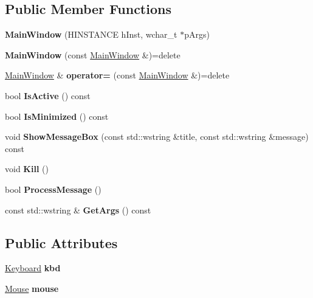 \subsection*{Public Member Functions}
\begin{DoxyCompactItemize}
\item 
\mbox{\label{class_main_window_a61c12aad464d82e94156c1b1b3e63c7a}} 
{\bfseries Main\+Window} (H\+I\+N\+S\+T\+A\+N\+CE h\+Inst, wchar\+\_\+t $\ast$p\+Args)
\item 
\mbox{\label{class_main_window_af1d822d2183a379458e4bc0e2ea2bf3b}} 
{\bfseries Main\+Window} (const \hyperlink{class_main_window}{Main\+Window} \&)=delete
\item 
\mbox{\label{class_main_window_aaa4474cfd4fdb8d3386764a6eb1a4684}} 
\hyperlink{class_main_window}{Main\+Window} \& {\bfseries operator=} (const \hyperlink{class_main_window}{Main\+Window} \&)=delete
\item 
\mbox{\label{class_main_window_a202e0f89c8b5cb7f4768172f35e49a1b}} 
bool {\bfseries Is\+Active} () const
\item 
\mbox{\label{class_main_window_affb4bb2c05bec8b71998772cfb94b43b}} 
bool {\bfseries Is\+Minimized} () const
\item 
\mbox{\label{class_main_window_a62dfc452524272c3153ca334c79d16d4}} 
void {\bfseries Show\+Message\+Box} (const std\+::wstring \&title, const std\+::wstring \&message) const
\item 
\mbox{\label{class_main_window_a35f292c078d17dcf4b6bc29506c354ec}} 
void {\bfseries Kill} ()
\item 
\mbox{\label{class_main_window_af0d6ad5abee9b887e41b432d744aa521}} 
bool {\bfseries Process\+Message} ()
\item 
\mbox{\label{class_main_window_aeac01b46a008ab1973df8622edb96e74}} 
const std\+::wstring \& {\bfseries Get\+Args} () const
\end{DoxyCompactItemize}
\subsection*{Public Attributes}
\begin{DoxyCompactItemize}
\item 
\mbox{\label{class_main_window_a94fc57f35085d78df196459a5d4bb3a6}} 
\hyperlink{class_keyboard}{Keyboard} {\bfseries kbd}
\item 
\mbox{\label{class_main_window_a95582efcb4d3547a6069b7fe24aa7d78}} 
\hyperlink{class_mouse}{Mouse} {\bfseries mouse}
\end{DoxyCompactItemize}
